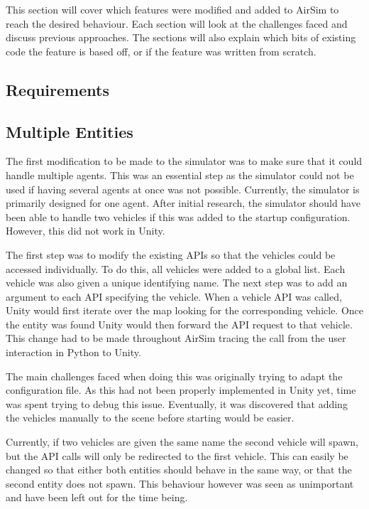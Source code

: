This section will cover which features were modified and added to AirSim to reach the desired behaviour. Each section will look at the challenges faced and discuss previous approaches. The sections will also explain which bits of existing code the feature is based off, or if the feature was written from scratch.

\subsection{Requirements}


\subsection{Multiple Entities}
The first modification to be made to the simulator was to make sure that it could handle multiple agents. This was an essential step as the simulator could not be used if having several agents at once was not possible. Currently, the simulator is primarily designed for one agent. After initial research, the simulator should have been able to handle two vehicles if this was added to the startup configuration. However, this did not work in Unity. 

The first step was to modify the existing APIs so that the vehicles could be accessed individually. To do this, all vehicles were added to a global list. Each vehicle was also given a unique identifying name. The next step was to add an argument to each API specifying the vehicle.  When a vehicle API was called, Unity would first iterate over the map looking for the corresponding vehicle. Once the entity was found Unity would then forward the API request to that vehicle. This change had to be made throughout AirSim tracing the call from the user interaction in Python to Unity. 

The main challenges faced when doing this was originally trying to adapt the configuration file. As this had not been properly implemented in Unity yet, time was spent trying to debug this issue. Eventually, it was discovered that adding the vehicles manually to the scene before starting would be easier. 

Currently, if two vehicles are given the same name the second vehicle will spawn, but the API calls will only be redirected to the first vehicle. This can easily be changed so that either both entities should behave in the same way, or that the second entity does not spawn. This behaviour however was seen as unimportant and have been left out for the time being. 
 

